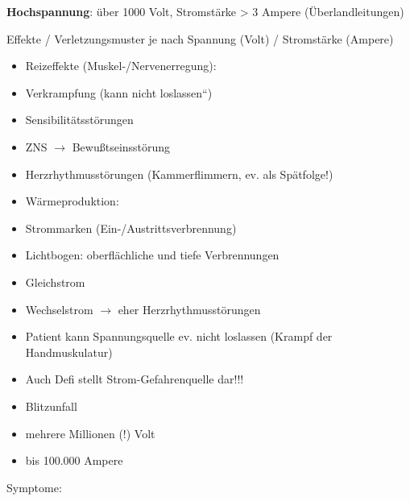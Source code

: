 \documentclass{article}
\newcommand\gT[1]{\textbf{\textup{\textcolor[rgb]{0.0,0.5019608,0.0}{#1}}}}
\begin{document}
{\mdseries
\gT{Hochspannung}: \"uber 1000 Volt, Stromst\"arke
{\textgreater}  3 Ampere (\"Uberlandleitungen) }

{\mdseries
Effekte / Verletzungsmuster je nach  Spannung (Volt) / Stromst\"arke
(Ampere)}

\begin{itemize}
\item {\mdseries
Reizeffekte (Muskel-/Nervenerregung):}

\end{itemize}
\begin{itemize}
\item {\mdseries
Verkrampfung ({\quotedblbase}kann nicht loslassen{\textquotedblleft})}

\item {\mdseries
Sensibilit\"atsst\"orungen}

\item {\mdseries
ZNS ${\rightarrow}$ Bewu{\ss}tseinsst\"orung}

\item {\mdseries
Herzrhythmusst\"orungen (Kammerflimmern, ev.  als Sp\"atfolge!)}

\end{itemize}
\begin{itemize}
\item {\mdseries
W\"armeproduktion:}

\end{itemize}
\begin{itemize}
\item {\mdseries
Strommarken (Ein-/Austrittsverbrennung)}

\item {\mdseries
Lichtbogen: oberfl\"achliche und tiefe  Verbrennungen}

\end{itemize}
\begin{itemize}
\item {\mdseries
Gleichstrom}

\item {\mdseries
Wechselstrom ${\rightarrow}$ eher  Herzrhythmusst\"orungen}

\item {\mdseries
Patient  kann Spannungsquelle ev. nicht  loslassen (Krampf der
Handmuskulatur)}

\item {\mdseries
Auch Defi stellt Strom-Gefahrenquelle  dar!!!}

\item {\mdseries
Blitzunfall}

\end{itemize}
\begin{itemize}
\item {\mdseries
mehrere Millionen (!) Volt}

\item {\mdseries
bis 100.000 Ampere}

\end{itemize}
{\mdseries\color{black}
Symptome:}
\end{document}
